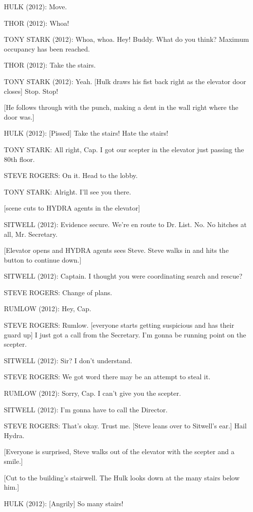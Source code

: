 HULK (2012): Move.

THOR (2012): Whoa!

TONY STARK (2012): Whoa, whoa. Hey! Buddy. What do you think? Maximum occupancy has been reached.

THOR (2012): Take the stairs.

TONY STARK (2012): Yeah. [Hulk draws his fist back right as the elevator door closes] Stop. Stop!

[He follows through with the punch, making a dent in the wall right where the door was.]

HULK (2012): [Pissed] Take the stairs! Hate the stairs!

TONY STARK: All right, Cap. I got our scepter in the elevator just passing the 80th floor.

STEVE ROGERS: On it. Head to the lobby.

TONY STARK: Alright. I'll see you there.

[scene cuts to HYDRA agents in the elevator]

SITWELL (2012): Evidence secure. We're en route to Dr. List. No. No hitches at all, Mr. Secretary.

[Elevator opens and HYDRA agents sees Steve. Steve walks in and hits the button to continue down.]

SITWELL (2012): Captain. I thought you were coordinating search and rescue?

STEVE ROGERS: Change of plans.

RUMLOW (2012): Hey, Cap.

STEVE ROGERS: Rumlow. [everyone starts getting suspicious and has their guard up] I just got a call from the Secretary. I'm gonna be running point on the scepter.

SITWELL (2012): Sir? I don't understand.

STEVE ROGERS: We got word there may be an attempt to steal it.

RUMLOW (2012): Sorry, Cap. I can't give you the scepter.

SITWELL (2012): I'm gonna have to call the Director.

STEVE ROGERS: That's okay. Trust me. [Steve leans over to Sitwell's ear.] Hail Hydra.

[Everyone is surprised, Steve walks out of the elevator with the scepter and a smile.]

[Cut to the building's stairwell. The Hulk looks down at the many stairs below him.]

HULK (2012): [Angrily] So many stairs!

